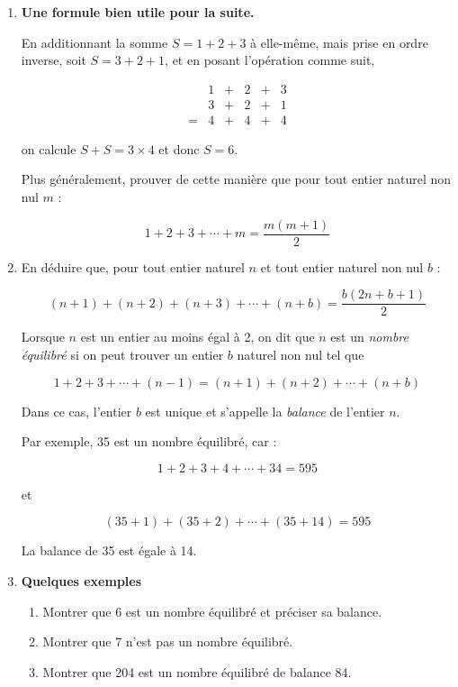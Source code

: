 \begin{enumerate}
\item \textbf{Une formule bien utile pour la suite.} 

En additionnant la somme \( S = 1 + 2 + 3 \) à elle-même, mais prise en ordre inverse, soit \( S = 3 + 2 + 1 \), et en posant l'opération comme suit,

\[\begin{array}{cccccc}
&1 & + & 2 & + & 3 \\
&3 & + & 2 & + & 1 \\
\hline
=&4 & + & 4 & + & 4 
\end{array}\]

on calcule \( S + S = 3 \times 4 \) et donc \( S = 6 \).

Plus généralement, prouver de cette manière que pour tout entier naturel non nul \( m \) :

\[1 + 2 + 3 + \cdots + m = \frac{m(m + 1)}{2}\]

\item {En déduire} que, pour tout entier naturel \( n \) et tout entier naturel non nul \( b \) :

\[(n + 1) + (n + 2) + (n + 3) + \cdots + (n + b) = \frac{b(2n + b + 1)}{2}\]

Lorsque \( n \) est un entier au moins égal à 2, on dit que \( n \) est un \emph{nombre équilibré} si on peut trouver un entier \( b \) naturel non nul tel que

\[1 + 2 + 3 + \cdots + (n - 1) = (n + 1) + (n + 2) + \cdots + (n + b)\]

Dans ce cas, l'entier \( b \) est unique et s'appelle la \emph{balance} de l'entier \( n \).

Par exemple, 35 est un nombre équilibré, car :

\[1 + 2 + 3 + 4 + \cdots + 34 = 595\]

et

\[(35 + 1) + (35 + 2) + \cdots + (35 + 14) = 595\]

La balance de 35 est égale à 14.

\item \textbf{Quelques exemples}
\begin{enumerate}
    \item Montrer que 6 est un nombre équilibré et préciser sa balance.
    \item Montrer que 7 n'est pas un nombre équilibré.
    \item Montrer que 204 est un nombre équilibré de balance 84.
\end{enumerate}


\end{enumerate}
